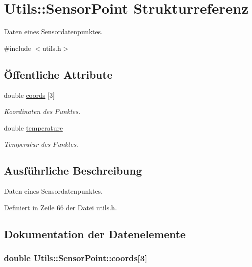 \hypertarget{structUtils_1_1SensorPoint}{\section{Utils\-:\-:Sensor\-Point Strukturreferenz}
\label{structUtils_1_1SensorPoint}
}


Daten eines Sensordatenpunktes.  




{\ttfamily \#include $<$utils.\-h$>$}

\subsection*{Öffentliche Attribute}
\begin{DoxyCompactItemize}
\item 
double \hyperlink{structUtils_1_1SensorPoint_aedff5493c2f6c36e9552dc3807c8ce24}{coords} \mbox{[}3\mbox{]}
\begin{DoxyCompactList}\small\item\em Koordinaten des Punktes. \end{DoxyCompactList}\item 
double \hyperlink{structUtils_1_1SensorPoint_a764d6572f865138b36cb46c910001e9a}{temperature}
\begin{DoxyCompactList}\small\item\em Temperatur des Punktes. \end{DoxyCompactList}\end{DoxyCompactItemize}


\subsection{Ausführliche Beschreibung}
Daten eines Sensordatenpunktes. 

Definiert in Zeile 66 der Datei utils.\-h.



\subsection{Dokumentation der Datenelemente}
\hypertarget{structUtils_1_1SensorPoint_aedff5493c2f6c36e9552dc3807c8ce24}{
\subsubsection[{coords}]{\setlength{\rightskip}{0pt plus 5cm}double Utils\-::\-Sensor\-Point\-::coords\mbox{[}3\mbox{]}}}\label{structUtils_1_1SensorPoint_aedff5493c2f6c36e9552dc3807c8ce24}


